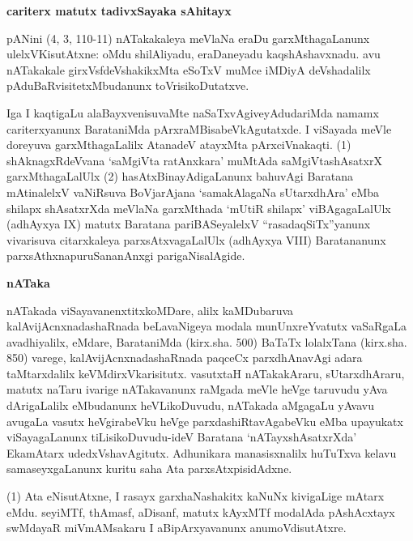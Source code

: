 \newpage

\begin{center}
{\Large\bf cariterx matutx tadivxSayaka sAhitayx}
\end{center}

pANini (4, 3, 110-11) nATakakaleya meVlaNa eraDu garxMthagaLanunx ulelxVKisutAtxne: oMdu shilAliyadu, eraDaneyadu kaqshAshavxnadu. avu nATakakale girxVsfdeVshakikxMta eSoTxV muMce iMDiyA deVshadalilx pAduBaRvisitetxMbudanunx toVrisikoDutatxve.

Iga I kaqtigaLu alaBayxvenisuvaMte naSaTxvAgiveyAdudariMda namamx cariterxyanunx BarataniMda pArxraMBisabeVkAgutatxde. I viSayada meVle doreyuva garxMthagaLalilx AtanadeV atayxMta pArxciVnakaqti. (1) shAknagxRdeVvana `saMgiVta ratAnxkara' muMtAda saMgiVtashAsatxrX garxMthagaLalUlx (2) hasAtxBinayAdigaLanunx bahuvAgi Baratana mAtinalelxV vaNiRsuva BoVjarAjana `samakAlagaNa sUtarxdhAra' eMba shilapx shAsatxrXda meVlaNa garxMthada `mUtiR shilapx' viBAgagaLalUlx (adhAyxya {\rm IX}) matutx Baratana pariBASeyalelxV ``rasadaqSiTx''yanunx vivarisuva citarxkaleya parxsAtxvagaLalUlx (adhAyxya {\rm VIII}) Baratananunx parxsAthxnapuruSananAnxgi parigaNisalAgide.

\smallskip
\begin{center}
{\Large\bf nATaka}
\end{center}

nATakada viSayavanenxtitxkoMDare, alilx kaMDubaruva kalAvijAcnxnadashaRnada beLavaNigeya modala munUnxreYvatutx vaSaRgaLa avadhiyalilx, eMdare, BarataniMda (kirx.sha. 500) BaTaTx lolalxTana (kirx.sha. 850) varege, kalAvijAcnxnadashaRnada paqceCx parxdhAnavAgi adara taMtarxdalilx keVMdirxVkarisitutx. vasutxtaH nATakakAraru, sUtarxdhAraru, matutx naTaru ivarige nATakavanunx raMgada meVle heVge taruvudu yAva dArigaLalilx eMbudanunx heVLikoDuvudu, nATakada aMgagaLu yAvavu avugaLa vasutx heVgirabeVku heVge parxdashiRtavAgabeVku eMba upayukatx viSayagaLanunx tiLisikoDuvudu-ideV Baratana `nATayxshAsatxrXda' EkamAtarx udedxVshavAgitutx. Adhunikara manasisxnalilx huTuTxva kelavu samaseyxgaLanunx kuritu saha Ata parxsAtxpisidAdxne.

(1) Ata eNisutAtxne, I rasayx garxhaNashakitx kaNuNx kivigaLige mAtarx eMdu. seyiMTf, thAmasf, aDisanf, matutx kAyxMTf modalAda pAshAcxtayx swMdayaR miVmAMsakaru I aBipArxyavanunx anumoVdisutAtxre.


